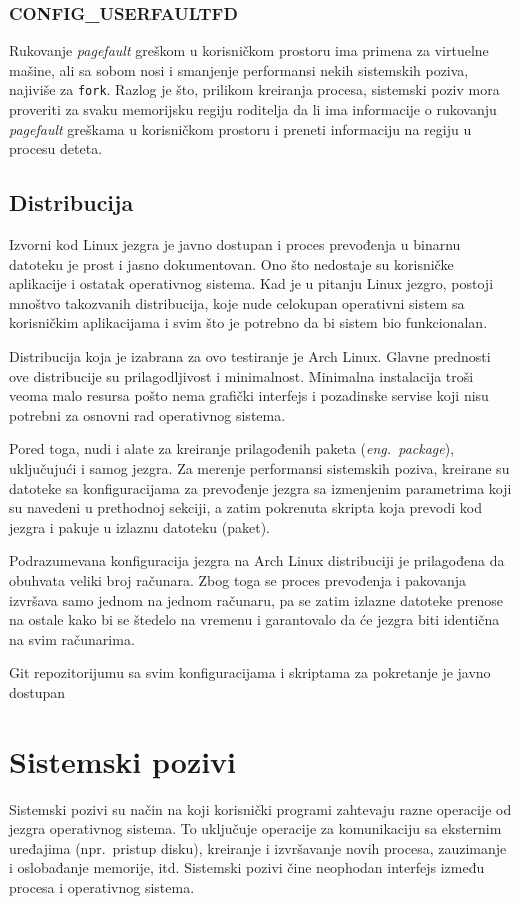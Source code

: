 \documentclass[12pt]{report}
\begin{document}
\subsection{CONFIG\_USERFAULTFD}
Rukovanje \textit{pagefault} greškom u korisničkom prostoru ima primena za virtuelne mašine, ali sa sobom nosi i smanjenje performansi nekih sistemskih poziva, najiviše za \texttt{fork}. Razlog je što, prilikom kreiranja procesa, sistemski poziv mora proveriti za svaku memorijsku regiju roditelja da li ima informacije o rukovanju \textit{pagefault} greškama u korisničkom prostoru i preneti informaciju na regiju u procesu deteta.

\section{Distribucija}
Izvorni kod Linux jezgra je javno dostupan i proces prevođenja u binarnu datoteku je prost i jasno dokumentovan. Ono što nedostaje su korisničke aplikacije i ostatak operativnog sistema. Kad je u pitanju Linux jezgro, postoji mnoštvo takozvanih distribucija, koje nude celokupan operativni sistem sa korisničkim aplikacijama i svim što je potrebno da bi sistem bio funkcionalan.

Distribucija koja je izabrana za ovo testiranje je Arch Linux. Glavne prednosti ove distribucije su prilagodljivost i minimalnost. Minimalna instalacija troši veoma malo resursa pošto nema grafički interfejs i pozadinske servise koji nisu potrebni za osnovni rad operativnog sistema.

Pored toga, nudi i alate za kreiranje prilagođenih paketa (\textit{eng.\ package}), uključujući i samog jezgra. Za merenje performansi sistemskih poziva, kreirane su datoteke sa konfiguracijama za prevođenje jezgra sa izmenjenim parametrima koji su navedeni u prethodnoj sekciji, a zatim pokrenuta skripta koja prevodi kod jezgra i pakuje u izlaznu datoteku (paket).

Podrazumevana konfiguracija jezgra na Arch Linux distribuciji je prilagođena da obuhvata veliki broj računara. Zbog toga se proces prevođenja i pakovanja izvršava samo jednom na jednom računaru, pa se zatim izlazne datoteke prenose na ostale kako bi se štedelo na vremenu i garantovalo da će jezgra biti identična na svim računarima.

Git repozitorijumu sa svim konfiguracijama i skriptama za pokretanje je javno dostupan~\cite{repo:runner}

\chapter{Sistemski pozivi}
Sistemski pozivi su način na koji korisnički programi zahtevaju razne operacije od jezgra operativnog sistema. To uključuje operacije za komunikaciju sa eksternim uređajima (npr.\ pristup disku), kreiranje i izvršavanje novih procesa, zauzimanje i oslobađanje memorije, itd. Sistemski pozivi čine neophodan interfejs između procesa i operativnog sistema.
\end{document}
